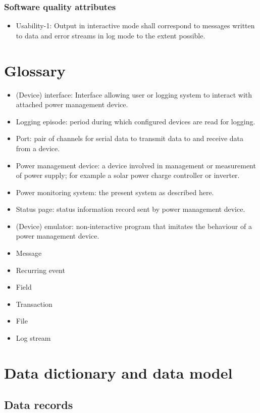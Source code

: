 \documentclass[pdftex,oneside,12pt,a4paper]{book}
\begin{document}
\subsection{Software quality attributes}
\begin{itemize}
\item Usability-1: Output in interactive mode shall correspond to messages written to data and error streams in log mode to the extent possible.
\end{itemize}

\chapter{Glossary}
\begin{itemize}
\item (Device) interface: Interface allowing user or logging system to interact with attached power management device.
\item Logging episode: period during which configured devices are read for logging.
\item Port: pair of channels for serial data to transmit data to and receive data from a device.
\item Power management device: a device involved in management or measurement of power supply; for example a solar power charge controller or inverter.
\item Power monitoring system: the present system as described here.
\item Status page: status information record sent by power management device.
\item (Device) emulator: non-interactive program that imitates the behaviour of a power management device.
\item Message
\item Recurring event
\item Field
\item Transaction
\item File
\item Log stream
\end{itemize}

\chapter{Data dictionary and data model}
\section{Data records}
\end{document}

